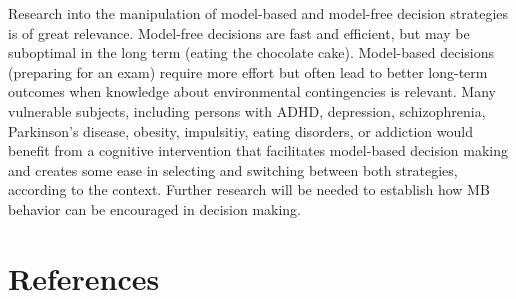 \documentclass[11pt]{article} %
\begin{document}
Research into the manipulation of model-based and model-free decision strategies is of great relevance. Model-free decisions are fast and efficient, but may be suboptimal in the long term (eating the chocolate cake). Model-based decisions (preparing for an exam) require more effort but often lead to better long-term outcomes when knowledge about environmental contingencies is relevant. Many vulnerable subjects, including persons with ADHD, depression, schizophrenia, Parkinson's disease, obesity, impulsitiy, eating disorders, or addiction would benefit from a cognitive intervention that facilitates model-based decision making and creates some ease in selecting and switching between both strategies, according to the context. Further research will be needed to establish how MB behavior can be encouraged in decision making.

\section{References}
\end{document}
